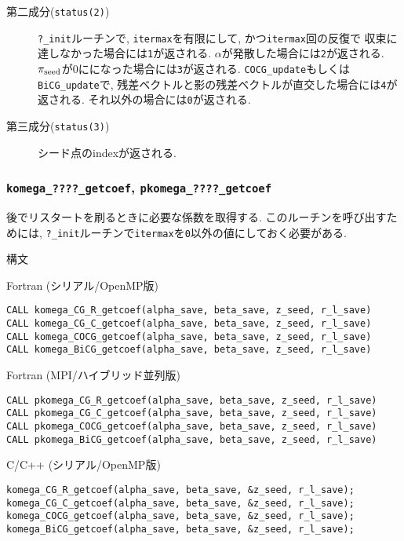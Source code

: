 \documentclass[12pt,titlepage]{jarticle}
\begin{document}
\begin{itemize}
\begin{description}
  \item [第二成分(\texttt{status(2)})]
    \verb|?_init|ルーチンで, \verb|itermax|を有限にして, かつ\verb|itermax|回の反復で
    収束に達しなかった場合には\verb|1|が返される.
    $\alpha$が発散した場合には\verb|2|が返される.
    $\pi_{\rm seed}$が0にになった場合には\verb|3|が返される.
    \verb|COCG_update|もしくは\verb|BiCG_update|で,
    残差ベクトルと影の残差ベクトルが直交した場合には\verb|4|が返される.
    それ以外の場合には\verb|0|が返される.

  \item [第三成分(\texttt{status(3)})]
    シード点のindexが返される.
  \end{description}

\end{itemize}

\subsubsection{\texttt{komega\_????\_getcoef}, \texttt{pkomega\_????\_getcoef}}

後でリスタートを刷るときに必要な係数を取得する.
このルーチンを呼び出すためには,
\verb|?_init|ルーチンで\verb|itermax|を\verb|0|以外の値にしておく必要がある.

\noindent 構文

\noindent Fortran (シリアル/OpenMP版)
\begin{verbatim}
CALL komega_CG_R_getcoef(alpha_save, beta_save, z_seed, r_l_save)
CALL komega_CG_C_getcoef(alpha_save, beta_save, z_seed, r_l_save)
CALL komega_COCG_getcoef(alpha_save, beta_save, z_seed, r_l_save)
CALL komega_BiCG_getcoef(alpha_save, beta_save, z_seed, r_l_save)
\end{verbatim}

\noindent Fortran (MPI/ハイブリッド並列版)
\begin{verbatim}
CALL pkomega_CG_R_getcoef(alpha_save, beta_save, z_seed, r_l_save)
CALL pkomega_CG_C_getcoef(alpha_save, beta_save, z_seed, r_l_save)
CALL pkomega_COCG_getcoef(alpha_save, beta_save, z_seed, r_l_save)
CALL pkomega_BiCG_getcoef(alpha_save, beta_save, z_seed, r_l_save)
\end{verbatim}

\noindent C/C++ (シリアル/OpenMP版)
\begin{verbatim}
komega_CG_R_getcoef(alpha_save, beta_save, &z_seed, r_l_save);
komega_CG_C_getcoef(alpha_save, beta_save, &z_seed, r_l_save);
komega_COCG_getcoef(alpha_save, beta_save, &z_seed, r_l_save);
komega_BiCG_getcoef(alpha_save, beta_save, &z_seed, r_l_save);
\end{verbatim}
\end{document}
